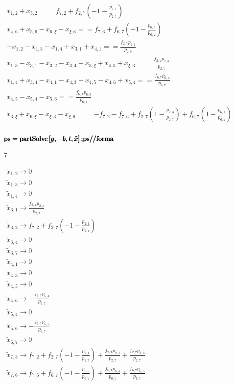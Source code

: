 \documentclass{article}
\begin{document}
\begin{doublespace}
\noindent\(\begin{array}{l}
 x_{1,2}+x_{3,2}==f_{7,2}+f_{2,7} \left(-1-\frac{p_{2,1}}{p_{2,7}}\right) \\
 x_{4,6}+x_{5,6}-x_{6,\xi }+x_{\xi ,6}==f_{7,6}+f_{6,7} \left(-1-\frac{p_{6,5}}{p_{6,7}}\right) \\
 -x_{1,2}-x_{1,3}-x_{1,4}+x_{3,1}+x_{4,1}==\frac{f_{2,7} p_{2,1}}{p_{2,7}} \\
 x_{1,3}-x_{3,1}-x_{3,2}-x_{3,4}-x_{3,\xi }+x_{4,3}+x_{\xi ,3}==\frac{f_{2,7} p_{2,3}}{p_{2,7}} \\
 x_{1,4}+x_{3,4}-x_{4,1}-x_{4,3}-x_{4,5}-x_{4,6}+x_{5,4}==\frac{f_{6,7} p_{6,4}}{p_{6,7}} \\
 x_{4,5}-x_{5,4}-x_{5,6}==\frac{f_{6,7} p_{6,5}}{p_{6,7}} \\
 x_{3,\xi }+x_{6,\xi }-x_{\xi ,3}-x_{\xi ,6}==-f_{7,2}-f_{7,6}+f_{2,7} \left(1-\frac{p_{2,3}}{p_{2,7}}\right)+f_{6,7} \left(1-\frac{p_{6,4}}{p_{6,7}}\right)
\\
\end{array}\)
\end{doublespace}

\begin{doublespace}
\noindent\(\pmb{\text{ps}=\text{partSolve}\left[g,-b,t,\tilde{x}\right];}\\
\pmb{\text{ps}\text{//}\text{forma}}\)
\end{doublespace}

\noindent\(7\)

\begin{doublespace}
\noindent\(\begin{array}{l}
 \tilde{x}_{1,2}\to 0 \\
 \tilde{x}_{1,3}\to 0 \\
 \tilde{x}_{1,4}\to 0 \\
 \tilde{x}_{3,1}\to \frac{f_{2,7} p_{2,1}}{p_{2,7}} \\
 \tilde{x}_{3,2}\to f_{7,2}+f_{2,7} \left(-1-\frac{p_{2,1}}{p_{2,7}}\right) \\
 \tilde{x}_{3,4}\to 0 \\
 \tilde{x}_{3,7}\to 0 \\
 \tilde{x}_{4,1}\to 0 \\
 \tilde{x}_{4,3}\to 0 \\
 \tilde{x}_{4,5}\to 0 \\
 \tilde{x}_{4,6}\to -\frac{f_{6,7} p_{6,4}}{p_{6,7}} \\
 \tilde{x}_{5,4}\to 0 \\
 \tilde{x}_{5,6}\to -\frac{f_{6,7} p_{6,5}}{p_{6,7}} \\
 \tilde{x}_{6,7}\to 0 \\
 \tilde{x}_{7,3}\to f_{7,2}+f_{2,7} \left(-1-\frac{p_{2,1}}{p_{2,7}}\right)+\frac{f_{2,7} p_{2,1}}{p_{2,7}}+\frac{f_{2,7} p_{2,3}}{p_{2,7}} \\
 \tilde{x}_{7,6}\to f_{7,6}+f_{6,7} \left(-1-\frac{p_{6,5}}{p_{6,7}}\right)+\frac{f_{6,7} p_{6,4}}{p_{6,7}}+\frac{f_{6,7} p_{6,5}}{p_{6,7}} \\
\end{array}\)
\end{doublespace}
\end{document}
